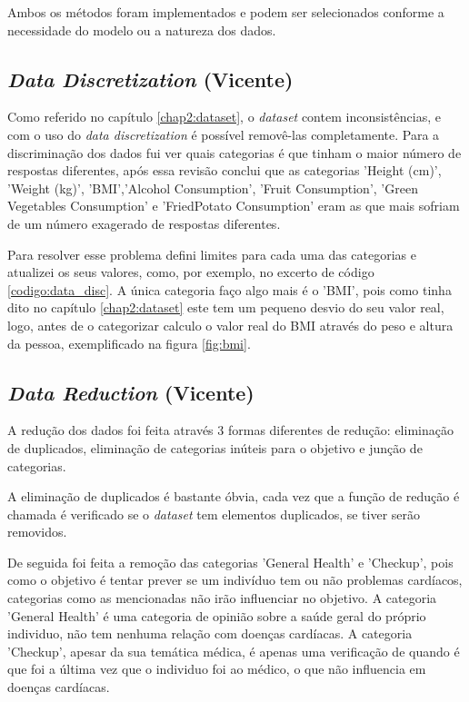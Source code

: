 Ambos os métodos foram implementados e podem ser selecionados conforme a necessidade do modelo ou a natureza dos dados.


\subsection{\textit{Data Discretization} (Vicente)}
\label{chap3:data_disc}

Como referido no capítulo \ref{chap2:dataset}, o \textit{dataset} contem inconsistências, e com o uso do \textit{data discretization} é possível removê-las completamente. Para a discriminação dos dados fui ver quais categorias é que tinham o maior número de respostas diferentes, após essa revisão conclui que as categorias 'Height (cm)', 'Weight (kg)', 'BMI','Alcohol Consumption', 'Fruit Consumption', 'Green Vegetables Consumption' e 'FriedPotato Consumption' eram as que mais sofriam de um número exagerado de respostas diferentes.

Para resolver esse problema defini limites para cada uma das categorias e atualizei os seus valores, como, por exemplo, no excerto de código \ref{codigo:data_disc}. A única categoria faço algo mais é o 'BMI', pois como tinha dito no capítulo \ref{chap2:dataset} este tem um pequeno desvio do seu valor real, logo, antes de o categorizar calculo o valor real do BMI através do peso e altura da pessoa, exemplificado na figura \ref{fig:bmi}.


\subsection{\textit{Data Reduction} (Vicente)}
\label{chap3:data_redu}

A redução dos dados foi feita através 3 formas diferentes de redução: eliminação de duplicados, eliminação de categorias inúteis para o objetivo e junção de categorias.

A eliminação de duplicados é bastante óbvia, cada vez que a função de redução é chamada é verificado se o \textit{dataset} tem elementos duplicados, se tiver serão removidos.

De seguida foi feita a remoção das categorias 'General Health' e 'Checkup', pois como o objetivo é tentar prever se um indivíduo tem ou não problemas cardíacos, categorias como as mencionadas não irão influenciar no objetivo. A categoria 'General Health' é uma categoria de opinião sobre a saúde geral do próprio individuo, não tem nenhuma relação com doenças cardíacas. A categoria 'Checkup', apesar da sua temática médica, é apenas uma verificação de quando é que foi a última vez que o individuo foi ao médico, o que não influencia em doenças cardíacas.

